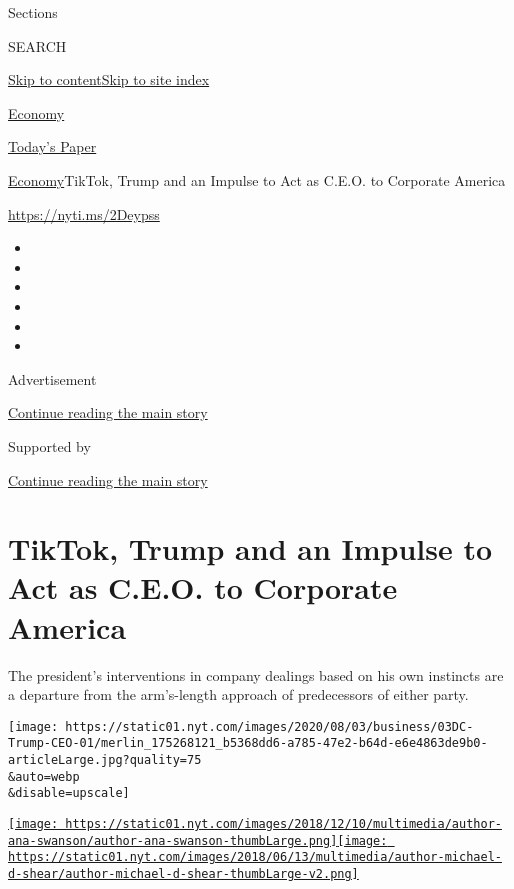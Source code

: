 Sections

SEARCH

\protect\hyperlink{site-content}{Skip to
content}\protect\hyperlink{site-index}{Skip to site index}

\href{https://www.nytimes.com/section/business/economy}{Economy}

\href{https://myaccount.nytimes.com/auth/login?response_type=cookie\&client_id=vi}{}

\href{https://www.nytimes.com/section/todayspaper}{Today's Paper}

\href{/section/business/economy}{Economy}\textbar{}TikTok, Trump and an
Impulse to Act as C.E.O. to Corporate America

\url{https://nyti.ms/2Deypss}

\begin{itemize}
\item
\item
\item
\item
\item
\item
\end{itemize}

Advertisement

\protect\hyperlink{after-top}{Continue reading the main story}

Supported by

\protect\hyperlink{after-sponsor}{Continue reading the main story}

\hypertarget{tiktok-trump-and-an-impulse-to-act-as-ceo-to-corporate-america}{%
\section{TikTok, Trump and an Impulse to Act as C.E.O. to Corporate
America}\label{tiktok-trump-and-an-impulse-to-act-as-ceo-to-corporate-america}}

The president's interventions in company dealings based on his own
instincts are a departure from the arm's-length approach of predecessors
of either party.

\texttt{[image: https://static01.nyt.com/images/2020/08/03/business/03DC-Trump-CEO-01/merlin\_175268121\_b5368dd6-a785-47e2-b64d-e6e4863de9b0-articleLarge.jpg?quality=75\\\&auto=webp\\\&disable=upscale]}

\href{https://www.nytimes.com/by/ana-swanson}{\texttt{[image: https://static01.nyt.com/images/2018/12/10/multimedia/author-ana-swanson/author-ana-swanson-thumbLarge.png]}}\href{https://www.nytimes.com/by/michael-d-shear}{\texttt{[image: https://static01.nyt.com/images/2018/06/13/multimedia/author-michael-d-shear/author-michael-d-shear-thumbLarge-v2.png]}}

